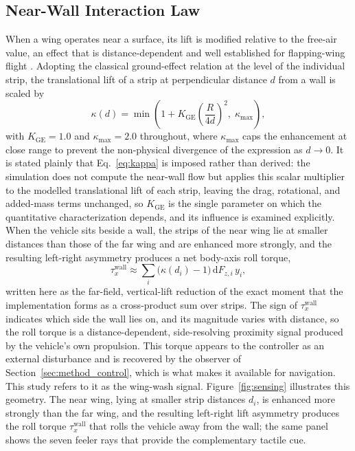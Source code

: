 \documentclass[final,5p,times]{elsarticle}
\begin{document}
\subsection{Near-Wall Interaction Law}
\label{sec:method_wingwash}

When a wing operates near a surface, its lift is modified relative to the free-air value, an effect that is distance-dependent and well established for flapping-wing flight \cite{cheeseman1959effect, maeda2013ground, lu2016ground}. Adopting the classical ground-effect relation at the level of the individual strip, the translational lift of a strip at perpendicular distance $d$ from a wall is scaled by
\begin{equation}
    \kappa(d) = \min\!\left( 1 + K_{\mathrm{GE}} \left( \frac{R}{4d} \right)^2,\; \kappa_{\max} \right),
    \label{eq:kappa}
\end{equation}
with $K_{\mathrm{GE}} = 1.0$ and $\kappa_{\max} = 2.0$ throughout, where $\kappa_{\max}$ caps the enhancement at close range to prevent the non-physical divergence of the expression as $d\to 0$. It is stated plainly that Eq.~\eqref{eq:kappa} is imposed rather than derived: the simulation does not compute the near-wall flow but applies this scalar multiplier to the modelled translational lift of each strip, leaving the drag, rotational, and added-mass terms unchanged, so $K_{\mathrm{GE}}$ is the single parameter on which the quantitative characterization depends, and its influence is examined explicitly. When the vehicle sits beside a wall, the strips of the near wing lie at smaller distances than those of the far wing and are enhanced more strongly, and the resulting left-right asymmetry produces a net body-axis roll torque,
\begin{equation}
    \tau_x^{\mathrm{wall}} \approx \sum_{i} \big( \kappa(d_i) - 1 \big)\, \mathrm{d}F_{z,i}\, y_i,
    \label{eq:tauwall}
\end{equation}
written here as the far-field, vertical-lift reduction of the exact moment that the implementation forms as a cross-product sum over strips. The sign of $\tau_x^{\mathrm{wall}}$ indicates which side the wall lies on, and its magnitude varies with distance, so the roll torque is a distance-dependent, side-resolving proximity signal produced by the vehicle's own propulsion. This torque appears to the controller as an external disturbance and is recovered by the observer of Section~\ref{sec:method_control}, which is what makes it available for navigation. This study refers to it as the wing-wash signal. Figure~\ref{fig:sensing} illustrates this geometry. The near wing, lying at smaller strip distances $d_i$, is enhanced more strongly than the far wing, and the resulting left-right lift asymmetry produces the roll torque $\tau_x^{\mathrm{wall}}$ that rolls the vehicle away from the wall; the same panel shows the seven feeler rays that provide the complementary tactile cue.
\end{document}
